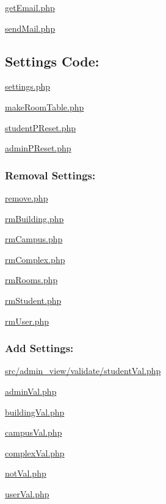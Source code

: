  \hyperlink{getEmail_8php}{get\-Email.\-php} \par
 \hyperlink{sendMail_8php}{send\-Mail.\-php} \par
\hypertarget{index_settings}{}\subsection{\-Settings Code\-:}\label{index_settings}
\hyperlink{settings_8php}{settings.\-php} \par
 \hyperlink{makeRoomTable_8php}{make\-Room\-Table.\-php} \par
 \hyperlink{studentPReset_8php}{student\-P\-Reset.\-php} \par
 \hyperlink{adminPReset_8php}{admin\-P\-Reset.\-php} \par
\hypertarget{index_removeal}{}\subsubsection{\-Removal Settings\-:}\label{index_removeal}
\hyperlink{remove_8php}{remove.\-php} \par
 \hyperlink{rmBuilding_8php}{rm\-Building.\-php} \par
 \hyperlink{rmCampus_8php}{rm\-Campus.\-php} \par
 \hyperlink{rmComplex_8php}{rm\-Complex.\-php} \par
 \hyperlink{rmRooms_8php}{rm\-Rooms.\-php} \par
 \hyperlink{rmStudent_8php}{rm\-Student.\-php} \par
 \hyperlink{rmUser_8php}{rm\-User.\-php} \par
\hypertarget{index_add}{}\subsubsection{\-Add Settings\-:}\label{index_add}
\hyperlink{admin__view_2validate_2studentVal_8php}{src/admin\-\_\-view/validate/student\-Val.\-php} \par
 \hyperlink{adminVal_8php}{admin\-Val.\-php} \par
 \hyperlink{buildingVal_8php}{building\-Val.\-php} \par
 \hyperlink{campusVal_8php}{campus\-Val.\-php} \par
 \hyperlink{complexVal_8php}{complex\-Val.\-php} \par
 \hyperlink{notVal_8php}{not\-Val.\-php} \par
 \hyperlink{userVal_8php}{user\-Val.\-php} \par
